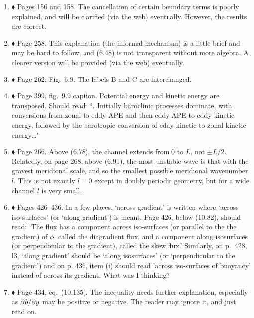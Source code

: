 \documentclass[10pt]{article}
\newcommand{\eq}{eq.\ } \newcommand{\Eq}{Eq.\ }
\renewcommand{\star}{\ensuremath{\blacklozenge} }
\begin{document}
\begin{enumerate}

\item \star \label{cancel} Pages 156 and 158. The cancellation of certain boundary terms is poorly explained, and will be clarified (via the web) eventually. However, the results are correct.

\item \star \label{informal} Page 258. This explanation (the informal mechanism) is a little brief and may be hard to follow, and (6.48) is not transparent without more algebra. A clearer version will be provided (via the web) eventually.

\item \star \label{eadyschem} Page 262, Fig.\ 6.9. The labels {\sf B} and {\sf C} are interchanged.

\item \star \label{simmhosk} Page 399, fig.\ 9.9 caption.  Potential energy and kinetic energy are transposed. Should read: ``\ldots Initially baroclinic processes dominate, with conversions from zonal to eddy APE and then eddy APE to eddy kinetic energy, followed by the barotropic conversion of eddy kinetic to zonal kinetic energy\ldots"

\item \star \label{channel} Page 266. Above (6.78), the channel extends from $0$ to $L$, not $\pm L/2$. Relatedly, on page 268, above (6.91), the most unstable wave is that with the gravest meridional scale, and so the smallest possible meridional wavenumber $l$. This is not exactly $l=0$ except in doubly periodic geometry, but for a wide channel $l$ is very small.


\item \star Pages 426--436. In a few places, `across gradient' is written where `across iso-surfaces' (or `along gradient') is meant. Page 426, below (10.82), should read: `The flux has a component across iso-surfaces (or parallel to the the gradient) of $\phi$, called the diagradient flux, and a component along isosurfaces (or perpendicular to the gradient), called the skew flux.' Similarly, on p.\ 428, l3, `along gradient' should be `along isosurfaces' (or `perpendicular to the gradient') and on p. 436, item (i) should read 'across iso-surfaces of buoyancy' instead of across its gradient. What was I thinking?

\item \star Page 434, \eq (10.135). The inequality needs further explanation, especially as ${\partial^{} b / \partial y^{}} $ may be positive or negative.  The reader may ignore it, and just read on.

\end{enumerate}
\end{document}
